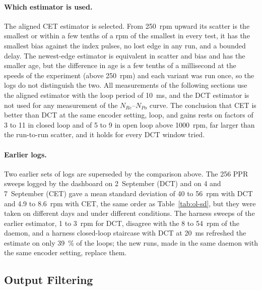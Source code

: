 \paragraph{Which estimator is used.}
The aligned CET estimator is selected. From 250~rpm upward its scatter is the smallest or within a few tenths of a rpm of the smallest in every test, it has the smallest bias against the index pulses, no lost edge in any run, and a bounded delay. The newest-edge estimator is equivalent in scatter and bias and has the smaller age, but the difference in age is a few tenths of a millisecond at the speeds of the experiment (above 250~rpm) and each variant was run once, so the logs do not distinguish the two. All measurements of the following sections use the aligned estimator with the loop period of 10~ms, and the DCT estimator is not used for any measurement of the $N_{Re}$--$N_{Po}$ curve. The conclusion that CET is better than DCT at the same encoder setting, loop, and gains rests on factors of 3 to 11 in closed loop and of 5 to 9 in open loop above 1000~rpm, far larger than the run-to-run scatter, and it holds for every DCT window tried.

\paragraph{Earlier logs.}
Two earlier sets of logs are superseded by the comparison above. The 256 PPR sweeps logged by the dashboard on 2~September (DCT) and on 4 and 7~September (CET) gave a mean standard deviation of 40 to 56~rpm with DCT and 4.9 to 8.6~rpm with CET, the same order as Table~\ref{tab:ol-sd}, but they were taken on different days and under different conditions. The harness sweeps of the earlier estimator, 1 to 3~rpm for DCT, disagree with the 8 to 54~rpm of the daemon, and a harness closed-loop staircase with DCT at 20~ms refreshed the estimate on only 39~\% of the loops; the new runs, made in the same daemon with the same encoder setting, replace them.


\subsection{Output Filtering}
\label{subsec:agit-filter}

